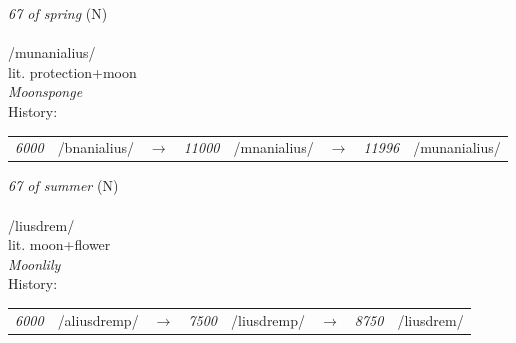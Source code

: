 \vspace{15pt}
\begin{nopagebreak}
 \textit{67 of spring} (N)\\
\\
\noindent /munanial{\textprimstress}ius/\\
\noindent lit. protection+moon\\
\noindent \textit{Moonsponge}\\


\noindent History:

\vspace{-0pt}
\hspace{40pt}
\begin{tabular}{ccc}
\textit{6000} & /bnanialius/&$\rightarrow$ & \textit{11000} & /mnanialius/&$\rightarrow$ & \textit{11996} & /munanialius/& \\
\end{tabular}

\vspace{20pt}\hline

\end{nopagebreak}
\filbreak



\vspace{15pt}
\begin{nopagebreak}
 \textit{67 of summer} (N)\\
\\
\noindent /li{\textprimstress}usdrem/\\
\noindent lit. moon+flower\\
\noindent \textit{Moonlily}\\


\noindent History:

\vspace{-0pt}
\hspace{40pt}
\begin{tabular}{ccc}
\textit{6000} & /aliusdremp/&$\rightarrow$ & \textit{7500} & /liusdremp/&$\rightarrow$ & \textit{8750} & /liusdrem/& \\
\end{tabular}

\vspace{20pt}\hline

\end{nopagebreak}
\filbreak



